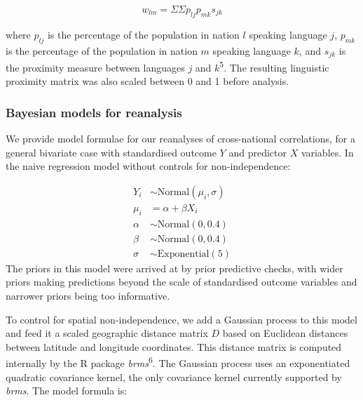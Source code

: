 \documentclass[
  english,
  man,floatsintext]{apa6}
\begin{document}
\begin{appendix}
\[
w_{lm} = {\Sigma}{\Sigma}p_{lj}p_{mk}s_{jk}
\]

where \(p_{lj}\) is the percentage of the population in nation \(l\)
speaking language \(j\), \(p_{mk}\) is the percentage of the population
in nation \(m\) speaking language \(k\), and \(s_{jk}\) is the proximity
measure between languages \(j\) and \(k\)\textsuperscript{5}. The
resulting linguistic proximity matrix was also scaled between 0 and 1
before analysis.

\hypertarget{bayesian-models-for-reanalysis}{%
\subsubsection{Bayesian models for
reanalysis}\label{bayesian-models-for-reanalysis}}

We provide model formulae for our reanalyses of cross-national
correlations, for a general bivariate case with standardised outcome
\(Y\) and predictor \(X\) variables. In the naive regression model
without controls for non-independence:

\[
\begin{aligned}
Y_{i} &\sim \text{Normal}(\mu_{i},\sigma) \\
\mu_{i} &= \alpha + \beta X_{i} \\
\alpha &\sim \text{Normal}(0, 0.4) \\
\beta &\sim \text{Normal}(0, 0.4) \\
\sigma &\sim \text{Exponential}(5)
\end{aligned}
\] The priors in this model were arrived at by prior predictive checks,
with wider priors making predictions beyond the scale of standardised
outcome variables and narrower priors being too informative.

\newpage

To control for spatial non-independence, we add a Gaussian process to
this model and feed it a scaled geographic distance matrix \(D\) based
on Euclidean distances between latitude and longitude coordinates. This
distance matrix is computed internally by the R package
\emph{brms}\textsuperscript{6}. The Gaussian process uses an
exponentiated quadratic covariance kernel, the only covariance kernel
currently supported by \emph{brms}. The model formula is:


\end{appendix}
\end{document}
